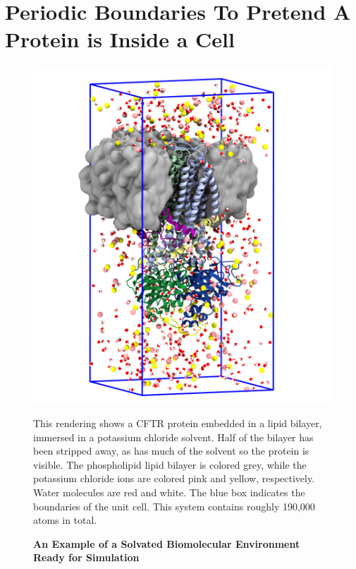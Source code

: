 \section{Periodic Boundaries To Pretend A Protein is Inside a Cell}
\begin{figure}
	\begin{center}
		\includegraphics[width=\textwidth]{figures/MD_unit_cell_example/MD_system.png}
	\end{center}
	\captionsetup{singlelinecheck = false, justification=raggedright}
	\caption[An Example of a Solvated Biomolecular Environment Ready for Simulation] {\textbf{An Example of a Solvated Biomolecular Environment Ready for Simulation}}{This rendering shows a CFTR protein embedded in a lipid bilayer, immersed in a potassium chloride solvent. Half of the bilayer has been stripped away, as has much of the solvent so the protein is visible. The phospholipid lipid bilayer is colored grey, while the potassium chloride ions are colored pink and yellow, respectively. Water molecules are red and white. The blue box indicates the boundaries of the unit cell. This system contains roughly 190,000 atoms in total.}
	\label{MD_environment}
\end{figure}

